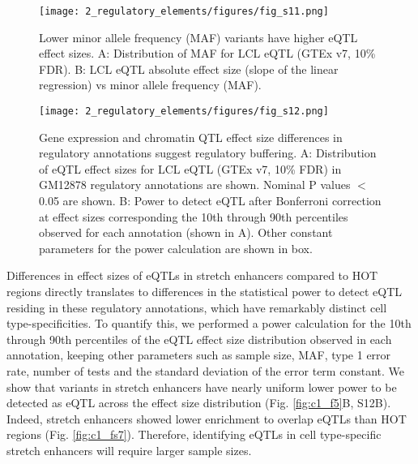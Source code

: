 \begin{figure}
    \centering
    \texttt{[image: 2\_regulatory\_elements/figures/fig\_s11.png]}
    \caption[Lower minor allele frequency (MAF) variants have higher eQTL effect sizes]{Lower minor allele frequency (MAF) variants have higher eQTL effect sizes. A: Distribution of MAF for LCL eQTL (GTEx v7, 10\% FDR). B: LCL eQTL absolute effect size (slope of the linear regression) vs minor allele frequency (MAF).}
    \label{fig:c1_fs11}
\end{figure}

\begin{figure}
    \centering
    \texttt{[image: 2\_regulatory\_elements/figures/fig\_s12.png]}
    \caption[Gene expression and chromatin QTL effect size differences in regulatory annotations suggest regulatory buffering]{Gene expression and chromatin QTL effect size differences in regulatory annotations suggest regulatory buffering. A: Distribution of eQTL effect sizes for LCL eQTL (GTEx v7, 10\% FDR) in GM12878 regulatory annotations are shown. Nominal P values $<$ 0.05 are shown. B: Power to detect eQTL after Bonferroni correction at effect sizes corresponding the 10th through 90th percentiles observed for each annotation (shown in A). Other constant parameters for the power calculation are shown in box.
}
    \label{fig:c1_fs12}
\end{figure}

Differences in effect sizes of eQTLs in stretch enhancers compared to HOT regions directly translates to differences in the statistical power to detect eQTL residing in these regulatory annotations, which have remarkably distinct cell type-specificities. To quantify this, we performed a power calculation for the 10th through 90th percentiles of the eQTL effect size distribution observed in each annotation, keeping other parameters such as sample size, MAF, type 1 error rate, number of tests and the standard deviation of the error term constant. We show that variants in stretch enhancers have nearly uniform lower power to be detected as eQTL across the effect size distribution (Fig. \ref{fig:c1_f5}B, S12B). Indeed, stretch enhancers showed lower enrichment to overlap eQTLs than HOT regions (Fig. \ref{fig:c1_fs7}). Therefore, identifying eQTLs in cell type-specific stretch enhancers will require larger sample sizes. \\


